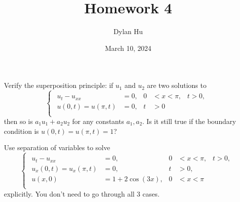 \documentclass[plain]{pset}
\title{Homework 4}
\author{Dylan Hu}
\date{March 10, 2024}
\begin{document}
\begin{multicols}{2}
    \raggedcolumns{}
    \maketitle
    \columnbreak{}
    \tableofcontents
\end{multicols}

\setlength{\parskip}{1em}

\pagebreak

\begin{problem}
Verify the superposition principle: if \(u_1\) and \(u_2\) are two solutions to
\[
    \begin{cases}
        \begin{aligned}
            u_t - u_{xx}        & = 0, & 0 & < x < \pi, & t > 0, \\
            u(0, t) = u(\pi, t) & = 0, & t & > 0                 \\
        \end{aligned}
    \end{cases}
\]
then so is \(a_1u_1 + a_2u_2\) for any constants \(a_1, a_2\). Is it still true if the boundary condition is \(u(0, t) = u(\pi, t) = 1\)?
\end{problem}
\begin{solution}

\end{solution}

\pagebreak

\begin{problem}
Use separation of variables to solve
\[
    \begin{cases}
        \begin{aligned}
            u_t - u_{xx}            & = 0,             & 0 & < x < \pi, & t > 0, \\
            u_x(0, t) = u_x(\pi, t) & = 0,             & t & > 0,                \\
            u(x, 0)                 & = 1 + 2\cos(3x), & 0 & < x < \pi           \\
        \end{aligned}
    \end{cases}
\]
explicitly. You don't need to go through all 3 cases.
\end{problem}
\begin{solution}

\end{solution}

\pagebreak
\end{document}
